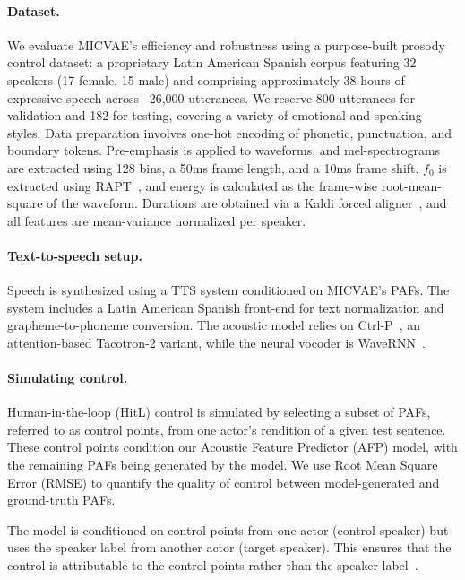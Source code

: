 \documentclass[a4paper,12pt,twoside,openright]{article}
\begin{document}
\paragraph{Dataset.} We evaluate MICVAE's efficiency and robustness using a purpose-built prosody control dataset: a proprietary Latin American Spanish corpus featuring 32 speakers (17 female, 15 male) and comprising approximately 38 hours of expressive speech across ~26,000 utterances. We reserve 800 utterances for validation and 182 for testing, covering a variety of emotional and speaking styles. Data preparation involves one-hot encoding of phonetic, punctuation, and boundary tokens. Pre-emphasis is applied to waveforms, and mel-spectrograms are extracted using 128 bins, a 50ms frame length, and a 10ms frame shift. \(f_0\) is extracted using RAPT~\parencite{RAPT:1995}, and energy is calculated as the frame-wise root-mean-square of the waveform. Durations are obtained via a Kaldi forced aligner~\parencite{PoveyASRU2011}, and all features are mean-variance normalized per speaker.

\paragraph{Text-to-speech setup.} Speech is synthesized using a TTS system conditioned on MICVAE's PAFs. The system includes a Latin American Spanish front-end for text normalization and grapheme-to-phoneme conversion. The acoustic model relies on Ctrl-P~\parencite{PaperCup-Ctrl-P:2021}, an attention-based Tacotron-2 variant, while the neural vocoder is WaveRNN~\parencite{waveRNN:2018}. 

\paragraph{Simulating control.} Human-in-the-loop (HitL) control is simulated by selecting a subset of PAFs, referred to as control points, from one actor's rendition of a given test sentence. These control points condition our Acoustic Feature Predictor (AFP) model, with the remaining PAFs being generated by the model. We use Root Mean Square Error (RMSE) to quantify the quality of control between model-generated and ground-truth PAFs.

The model is conditioned on control points from one actor (control speaker) but uses the speaker label from another actor (target speaker). This ensures that the control is attributable to the control points rather than the speaker label~\parencite{Sini2020IntroducingPS}.
\end{document}
